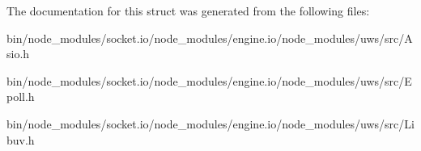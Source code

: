 The documentation for this struct was generated from the following files\+:\begin{DoxyCompactItemize}
\item 
bin/node\+\_\+modules/socket.\+io/node\+\_\+modules/engine.\+io/node\+\_\+modules/uws/src/Asio.\+h\item 
bin/node\+\_\+modules/socket.\+io/node\+\_\+modules/engine.\+io/node\+\_\+modules/uws/src/Epoll.\+h\item 
bin/node\+\_\+modules/socket.\+io/node\+\_\+modules/engine.\+io/node\+\_\+modules/uws/src/Libuv.\+h\end{DoxyCompactItemize}
